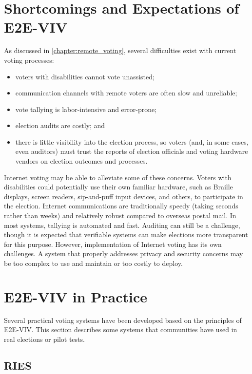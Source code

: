 \section{Shortcomings and Expectations of E2E-VIV}

As discussed in \autoref{chapter:remote_voting}, several difficulties
exist with current voting processes:

\begin{itemize}
\item voters with disabilities cannot vote unassisted; 
\item communication channels with remote voters are often slow and
  unreliable;
\item vote tallying is labor-intensive and error-prone; 
\item election audits are costly; and
\item there is little visibility into the election process, so voters
  (and, in some cases, even auditors) must trust the reports of
  election officials and voting hardware vendors on election outcomes
  and processes.
\end{itemize}

Internet voting may be able to alleviate some of these
concerns. Voters with disabilities could potentially use their own
familiar hardware, such as Braille displays, screen readers,
sip-and-puff input devices, and others, to participate in the
election. Internet communications are traditionally speedy (taking
seconds rather than weeks) and relatively robust compared to overseas
postal mail. In most systems, tallying is automated and fast. Auditing
can still be a challenge, though it is expected that verifiable
systems can make elections more transparent for this purpose. However,
implementation of Internet voting has its own challenges. A system
that properly addresses privacy and security concerns may be too
complex to use and maintain or too costly to deploy.

\section{E2E-VIV in Practice}

Several practical voting systems have been developed based on the
principles of E2E-VIV. This section describes some systems that
communities have used in real elections or pilot tests.

\subsection{RIES}
\label{sec:ries} 

